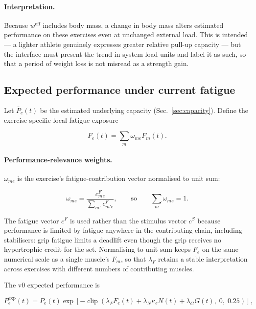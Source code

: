\documentclass[11pt]{article}
\begin{document}
\paragraph{Interpretation.} Because $w^{\mathrm{eff}}$ includes body mass, a change in body mass alters estimated performance on these exercises even at unchanged external load. This is intended --- a lighter athlete genuinely expresses greater relative pull-up capacity --- but the interface must present the trend in system-load units and label it as such, so that a period of weight loss is not misread as a strength gain.

\subsection{Expected performance under current fatigue}
\label{sec:perf}

Let $\bar P_e(t)$ be the estimated underlying capacity (Sec.~\ref{sec:capacity}). Define the exercise-specific local fatigue exposure

\begin{equation}
F_e(t)=\sum_m \omega_{me}F_m(t).
\end{equation}

\paragraph{Performance-relevance weights.} $\omega_{me}$ is the exercise's fatigue-contribution vector normalised to unit sum:

\begin{equation}
\omega_{me}=\frac{c^{F}_{me}}{\sum_{m'}c^{F}_{m'e}},
\qquad\text{so}\qquad
\sum_m\omega_{me}=1 .
\end{equation}

The fatigue vector $c^F$ is used rather than the stimulus vector $c^S$ because performance is limited by fatigue anywhere in the contributing chain, including stabilisers: grip fatigue limits a deadlift even though the grip receives no hypertrophic credit for the set. Normalising to unit sum keeps $F_e$ on the same numerical scale as a single muscle's $F_m$, so that $\lambda_F$ retains a stable interpretation across exercises with different numbers of contributing muscles.

The v0 expected performance is

\begin{equation}
P_e^{\mathrm{exp}}(t)
=\bar P_e(t)\exp\left[-\operatorname{clip}\left(
\lambda_FF_e(t)+\lambda_N\kappa_eN(t)+\lambda_GG(t),\;0,\;0.25\right)\right],
\end{equation}
\end{document}
